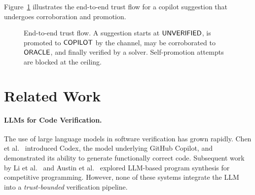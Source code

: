 \documentclass[11pt]{article}
\begin{document}
Figure~\ref{fig:trust-flow} illustrates the end-to-end trust flow
for a copilot suggestion that undergoes corroboration and
promotion.

\begin{figure}[ht]
\centering
{}
\caption{End-to-end trust flow.  A suggestion starts at
  $\mathsf{UNVERIFIED}$, is promoted to $\mathsf{COPILOT}$ by the channel, may be
  corroborated to $\mathsf{ORACLE}$, and finally verified by a solver.
  Self-promotion attempts are blocked at the ceiling.}
\label{fig:trust-flow}
\end{figure}


\section{Related Work}\label{sec:related}

\paragraph{LLMs for Code Verification.}
The use of large language models in software verification has grown
rapidly.  Chen et al.~\cite{chen2021codex} introduced Codex, the
model underlying GitHub Copilot, and demonstrated its ability to
generate functionally correct code.  Subsequent work by
Li et al.~\cite{li2022competition} and
Austin et al.~\cite{austin2021program} explored LLM-based program
synthesis for competitive programming.  However, none of these
systems integrate the LLM into a \emph{trust-bounded} verification
pipeline.
\end{document}
